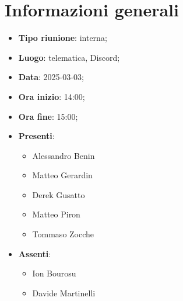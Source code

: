 \section{Informazioni generali}
\begin{itemize}
  \item \textbf{Tipo riunione}: interna;
  \item \textbf{Luogo}: telematica, Discord;
  \item \textbf{Data}: 2025-03-03;
  \item \textbf{Ora inizio}: 14:00;
  \item \textbf{Ora fine}: 15:00;
  
  \item \textbf{Presenti}:
  \begin{itemize}
    \item Alessandro Benin
    
    \item Matteo Gerardin
    \item Derek Gusatto
   
    \item Matteo Piron
    \item Tommaso Zocche
  \end{itemize}

  \item \textbf{Assenti}:
  \begin{itemize}
   
    \item Ion Bourosu
   
    \item Davide Martinelli
    
  \end{itemize}
 
\end{itemize}